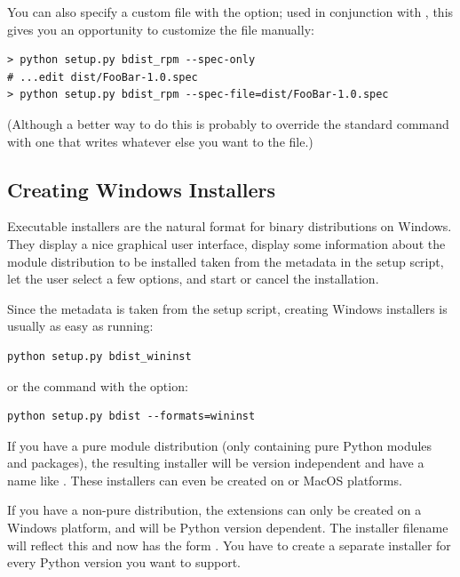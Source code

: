 \documentclass{howto}
\begin{document}
You can also specify a custom  file with the
 option; used in conjunction with
, this gives you an opportunity to customize
the  file manually:

\begin{verbatim}
> python setup.py bdist_rpm --spec-only
# ...edit dist/FooBar-1.0.spec
> python setup.py bdist_rpm --spec-file=dist/FooBar-1.0.spec
\end{verbatim}

(Although a better way to do this is probably to override the standard
 command with one that writes whatever else you want
to the  file.)


\subsection{Creating Windows Installers}
\label{creating-wininst}

Executable installers are the natural format for binary distributions
on Windows.  They display a nice graphical user interface, display
some information about the module distribution to be installed taken
from the metadata in the setup script, let the user select a few
options, and start or cancel the installation.

Since the metadata is taken from the setup script, creating Windows
installers is usually as easy as running:

\begin{verbatim}
python setup.py bdist_wininst
\end{verbatim}

or the  command with the  option:

\begin{verbatim}
python setup.py bdist --formats=wininst
\end{verbatim}

If you have a pure module distribution (only containing pure Python
modules and packages), the resulting installer will be version
independent and have a name like .  These
installers can even be created on \UNIX{} or MacOS platforms.

If you have a non-pure distribution, the extensions can only be
created on a Windows platform, and will be Python version dependent.
The installer filename will reflect this and now has the form
.  You have to create a separate installer
for every Python version you want to support.
\end{document}
